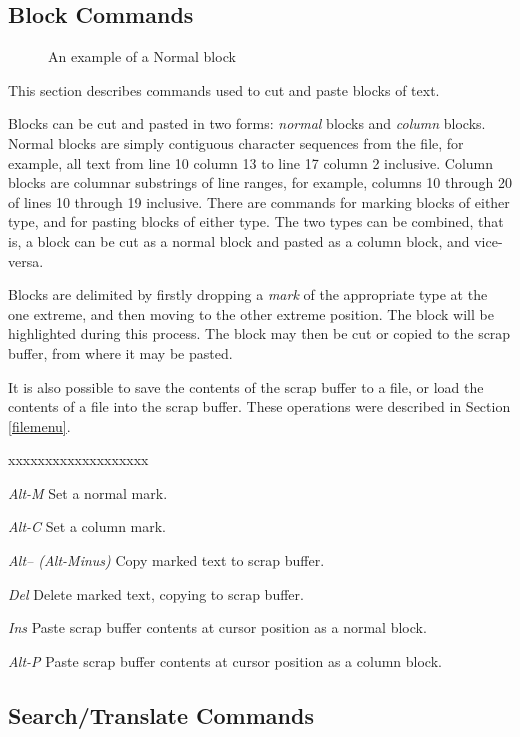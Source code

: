 \subsection[Block Commands]{Block Commands}

\begin{figure}
\vspace{15cm}
\caption{\label{normal-block} An example of a Normal block}
\end{figure}

This section describes commands used to cut and paste blocks of text.

Blocks can be cut and pasted in two forms: {\em normal} blocks and
{\em column} blocks. Normal blocks are simply contiguous character
sequences from the file, for example, all text from line 10 column 13
to line 17 column 2 inclusive.
Column blocks are columnar substrings
of line ranges, for example, columns 10 through 20 of lines 10
through 19 inclusive.
There are commands for marking blocks of either
type, and for pasting blocks of either type. The two types can be
combined, that is, a block can be cut as a normal block and pasted as
a column block, and vice-versa.

Blocks are delimited by firstly dropping a {\em mark} of the
appropriate type at the one extreme, and then moving to the other
extreme position. The block will be highlighted during this process.
The block may then be cut or copied to the scrap buffer,
from where it may be pasted.

It is also possible to save the contents of the scrap buffer to a
file, or load the contents of a file into the scrap buffer. These
operations were described in Section \ref{filemenu}.

\begin{describe}{xxxxxxxxxxxxxxxxxxx}
\item[\em Alt-M]Set a normal mark.
\item[\em Alt-C]Set a column mark.
\item[\em Alt-- (Alt-Minus)]Copy marked text to scrap buffer.
\item[\em Del]Delete marked text, copying to scrap buffer.
\item[\em Ins]Paste scrap buffer contents at cursor position as a
normal block.
\item[\em Alt-P]Paste scrap buffer contents at cursor position as a
column block.
\end{describe}


\subsection[Search/Translate Commands]{Search/Translate Commands}

